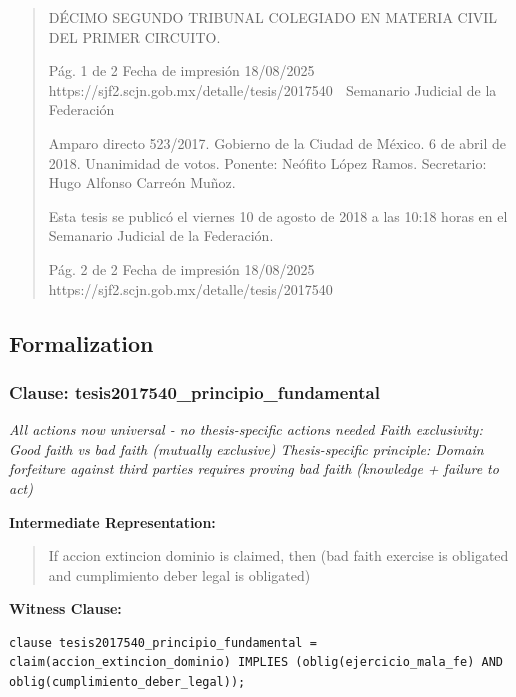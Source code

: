 \documentclass[11pt,a4paper]{article}
\begin{document}
\begin{quote}
DÉCIMO SEGUNDO TRIBUNAL COLEGIADO EN MATERIA CIVIL DEL PRIMER CIRCUITO.


                                              Pág. 1 de 2             Fecha de impresión 18/08/2025
  https://sjf2.scjn.gob.mx/detalle/tesis/2017540
                                                  Semanario Judicial de la Federación



Amparo directo 523/2017. Gobierno de la Ciudad de México. 6 de abril de 2018. Unanimidad de
votos. Ponente: Neófito López Ramos. Secretario: Hugo Alfonso Carreón Muñoz.


Esta tesis se publicó el viernes 10 de agosto de 2018 a las 10:18 horas en el Semanario Judicial
de la Federación.




                                             Pág. 2 de 2         Fecha de impresión 18/08/2025
 https://sjf2.scjn.gob.mx/detalle/tesis/2017540

\end{quote}

\subsection{Formalization}

\subsubsection{Clause: tesis2017540\_principio\_fundamental}

\textit{All actions now universal - no thesis-specific actions needed Faith exclusivity: Good faith vs bad faith (mutually exclusive) Thesis-specific principle: Domain forfeiture against third parties requires proving bad faith (knowledge + failure to act)}

\textbf{Intermediate Representation:}

\begin{quote}
If accion extincion dominio is claimed, then (bad faith exercise is obligated and cumplimiento deber legal is obligated)
\end{quote}

\textbf{Witness Clause:}

\begin{lstlisting}[style=witnessstyle, language=Witness]
clause tesis2017540_principio_fundamental = claim(accion_extincion_dominio) IMPLIES (oblig(ejercicio_mala_fe) AND oblig(cumplimiento_deber_legal));
\end{lstlisting}
\end{document}
